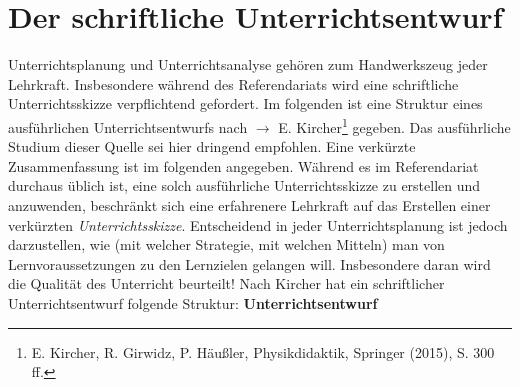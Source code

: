 \chapter{Der schriftliche Unterrichtsentwurf}\label{Entwurf}

Unterrichtsplanung und Unterrichtsanalyse geh\"{o}ren zum Handwerkszeug jeder Lehrkraft. Insbesondere w\"{a}hrend des Referendariats wird eine schriftliche Unterrichtsskizze verpflichtend gefordert. Im folgenden ist eine Struktur eines ausf\"{u}hrlichen Unterrichtsentwurfs nach $\to$ E. Kircher\footnote{E. Kircher, R. Girwidz, P. H\"{a}u{\ss}ler, Physikdidaktik, Springer (2015), S. 300 ff.} gegeben. Das ausf\"{u}hrliche Studium dieser Quelle sei hier dringend empfohlen. Eine verk\"{u}rzte Zusammenfassung ist im folgenden angegeben. W\"{a}hrend es im Referendariat durchaus \"{u}blich ist, eine solch ausf\"{u}hrliche Unterrichtsskizze zu erstellen und anzuwenden, beschr\"{a}nkt sich eine erfahrenere Lehrkraft auf das Erstellen einer verk\"{u}rzten \emph{Unterrichtsskizze}. Entscheidend in jeder Unterrichtsplanung ist jedoch darzustellen, wie (mit welcher Strategie, mit welchen Mitteln) man von Lernvoraussetzungen zu den Lernzielen gelangen will. Insbesondere daran wird die Qualit\"{a}t des Unterricht beurteilt! 
\mip
Nach Kircher hat ein schriftlicher Unterrichtsentwurf folgende Struktur:
\bip
\textbf{Unterrichtsentwurf} 

